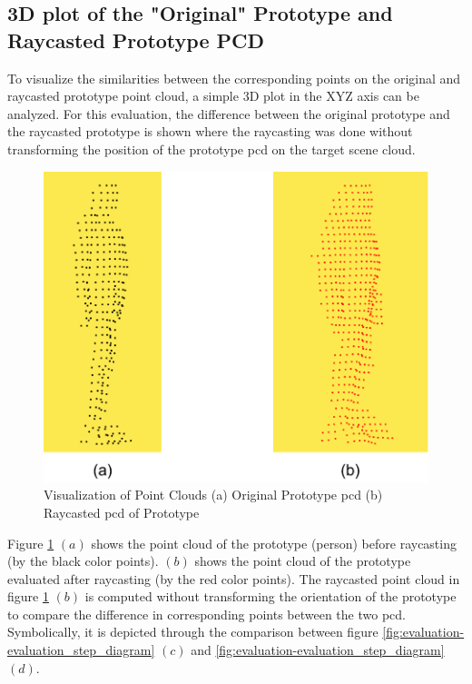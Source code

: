 \subsection{3D plot of the "Original" Prototype and Raycasted Prototype PCD}\label{sec:3dplot}
To visualize the similarities between the corresponding points on the original and raycasted prototype point cloud, a simple 3D plot in the XYZ axis can be analyzed. For this evaluation, the difference between the original prototype and the raycasted prototype is shown where the raycasting was done without transforming the position of the prototype \acrshort{pcd} on the target scene cloud.

\begin{figure}[htbp]
    \centering
    \includegraphics[width=0.75\linewidth]{97_graphics//evaluation/original_vs_raycasted_pcd.pdf}
    \caption[Visualization of Point Clouds]{Visualization of Point Clouds (a) Original Prototype \acrshort{pcd} (b) Raycasted \acrshort{pcd} of Prototype}
    \label{fig:evaluation-original_vs_raycasted_pcd}
\end{figure}

Figure \ref{fig:evaluation-original_vs_raycasted_pcd} \((a)\) shows the point cloud of the prototype (person) before raycasting (by the black color points). \((b)\) shows the point cloud of the prototype evaluated after raycasting  (by the red color points). The raycasted point cloud in figure \ref{fig:evaluation-original_vs_raycasted_pcd} \((b)\) is computed without transforming the orientation of the prototype to compare the difference in corresponding points between the two \acrshort{pcd}. Symbolically, it is depicted through the comparison between figure \ref{fig:evaluation-evaluation_step_diagram} \((c)\) and \ref{fig:evaluation-evaluation_step_diagram} \((d)\).


